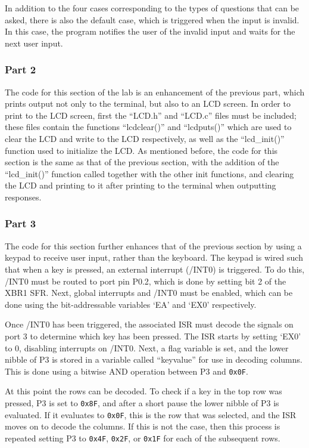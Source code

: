 \documentclass[12pt]{article}
\begin{document}
In addition to the four cases corresponding to the types of questions that can be asked, there is also the default case, which is triggered when the input is invalid. In this case, the program notifies the user of the invalid input and waits for the next user input. 

\subsubsection{Part 2}
The code for this section of the lab is an enhancement of the previous part, which prints output not only to the terminal, but also to an LCD screen. In order to print to the LCD screen, first the ``LCD.h'' and ``LCD.c'' files must be included; these files contain the functions ``lcd\textunderscore clear()'' and ``lcd\textunderscore puts()'' which are used to clear the LCD and write to the LCD respectively, as well as the ``lcd\_init()'' function used to initialize the LCD. As mentioned before, the code for this section is the same as that of the previous section, with the addition of the ``lcd\_init()'' function called together with the other init functions, and clearing the LCD and printing to it after printing to the terminal when outputting responses. 

\subsubsection{Part 3}
The code for this section further enhances that of the previous section by using a keypad to receive user input, rather than the keyboard. The keypad is wired such that when a key is pressed, an external interrupt (/INT0) is triggered. To do this, /INT0 must be routed to port pin P0.2, which is done by setting bit 2 of the XBR1 SFR. Next, global interrupts and /INT0 must be enabled, which can be done using the bit-addressable variables `EA' and `EX0' respectively. 

Once /INT0 has been triggered, the associated ISR must decode the signals on port 3 to determine which key has been pressed. The ISR starts by setting `EX0' to 0, disabling interrupts on /INT0. Next, a flag variable is set, and the lower nibble of P3 is stored in a variable called ``keyvalue'' for use in decoding columns. This is done using a bitwise AND operation between P3 and \texttt{0x0F}.

At this point the rows can be decoded. To check if a key in the top row was pressed, P3 is set to \texttt{0x8F}, and after a short pause the lower nibble of P3 is evaluated. If it evaluates to \texttt{0x0F}, this is the row that was selected, and the ISR moves on to decode the columns. If this is not the case, then this process is repeated setting P3 to \texttt{0x4F}, \texttt{0x2F}, or \texttt{0x1F} for each of the subsequent rows. 
\end{document}
